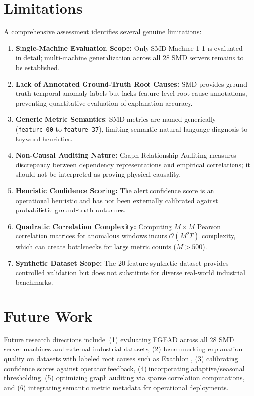 \documentclass[conference]{IEEEtran}
\begin{document}
\section{Limitations}
A comprehensive assessment identifies several genuine limitations:
\begin{enumerate}
    \item \textbf{Single-Machine Evaluation Scope:} Only SMD Machine 1-1 is evaluated in detail; multi-machine generalization across all 28 SMD servers remains to be established.
    \item \textbf{Lack of Annotated Ground-Truth Root Causes:} SMD provides ground-truth temporal anomaly labels but lacks feature-level root-cause annotations, preventing quantitative evaluation of explanation accuracy.
    \item \textbf{Generic Metric Semantics:} SMD metrics are named generically (\texttt{feature\_00} to \texttt{feature\_37}), limiting semantic natural-language diagnosis to keyword heuristics.
    \item \textbf{Non-Causal Auditing Nature:} Graph Relationship Auditing measures discrepancy between dependency representations and empirical correlations; it should not be interpreted as proving physical causality.
    \item \textbf{Heuristic Confidence Scoring:} The alert confidence score is an operational heuristic and has not been externally calibrated against probabilistic ground-truth outcomes.
    \item \textbf{Quadratic Correlation Complexity:} Computing $M \times M$ Pearson correlation matrices for anomalous windows incurs $\mathcal{O}(M^2 T)$ complexity, which can create bottlenecks for large metric counts ($M > 500$).
    \item \textbf{Synthetic Dataset Scope:} The 20-feature synthetic dataset provides controlled validation but does not substitute for diverse real-world industrial benchmarks.
\end{enumerate}

\section{Future Work}
Future research directions include: (1) evaluating FGEAD across all 28 SMD server machines and external industrial datasets, (2) benchmarking explanation quality on datasets with labeled root causes such as Exathlon \cite{jacob2021exathlon}, (3) calibrating confidence scores against operator feedback, (4) incorporating adaptive/seasonal thresholding, (5) optimizing graph auditing via sparse correlation computations, and (6) integrating semantic metric metadata for operational deployments.
\end{document}
